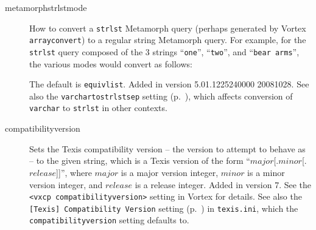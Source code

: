 \begin{description}
\item[metamorphstrlstmode]
\label{`metamorphstrlstmode'}
  How to convert a \verb`strlst` Metamorph query (perhaps generated by
  Vortex \verb`arrayconvert`) to a regular string Metamorph query.
  For example, for the \verb`strlst` query composed of the 3 strings
  ``\verb`one`'', ``\verb`two`'', and ``\verb`bear arms`'', the
  various modes would convert as follows:


  The default is \verb`equivlist`.  Added in version 5.01.1225240000
  20081028.  See also the \verb`varchartostrlstsep` setting
  (p.~\pageref{`varchartostrlstsep'}), which affects conversion of
  \verb`varchar` to \verb`strlst` in other contexts.

\item[compatibilityversion]
\label{SqlPropertyCompatibilityVersion}

  Sets the Texis compatibility version -- the version to attempt to
  behave as -- to the given string, which is a Texis version of the
  form ``$major$[.$minor$[.$release$]]'', where $major$ is a major
  version integer, $minor$ is a minor version integer, and $release$
  is a release integer.  Added in version 7.  See the
  \verb`<vxcp compatibilityversion>` setting in Vortex for details.
  See also the {\tt [Texis] Compatibility Version} setting
  (p.~\pageref{TexisIniTexisCompatibilityVersion}) in {\tt texis.ini},
  which the \verb`compatibilityversion` setting defaults to.


\end{description}
